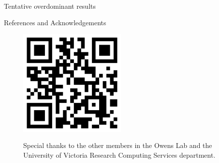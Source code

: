 \documentclass[final]{beamer}
\newlength{\sepwidth}
\newlength{\colwidth}
\newcommand{\separatorcolumn}{\begin{column}{\sepwidth}\end{column}}
\begin{document}
\begin{frame}[t]
\begin{columns}[t]
\begin{column}{\colwidth}
\begin{exampleblock}{Tentative overdominant results}
    \end{exampleblock}

  \begin{block}{References and Acknowledgements}

  \begin{figure}
    \begin{minipage}[c]{0.3\textwidth}
            \includegraphics[width=0.5\textwidth]{images/qr.png}
          \end{minipage}\hfill
          \begin{minipage}[c]{0.67\textwidth}
              Special thanks to the other members in the Owens Lab and the University of Victoria Research Computing Services department.
          \end{minipage}\hfill
    \end{figure}

  \end{block}

\end{column}

\separatorcolumn
\end{columns}
\end{frame}
\end{document}
